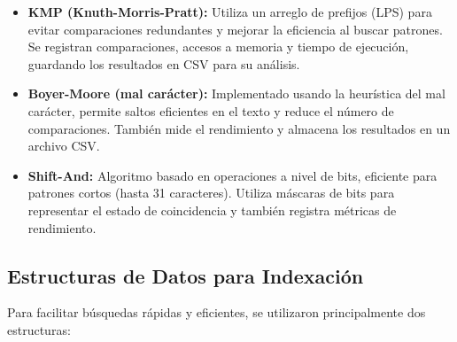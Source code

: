 \documentclass[9pt,letterpaper,onecolumn]{rho-class/rho}
\begin{document}
\begin{itemize}
    \item \textbf{KMP (Knuth-Morris-Pratt):}  
    Utiliza un arreglo de prefijos (LPS) para evitar comparaciones redundantes y mejorar la eficiencia al buscar patrones. Se registran comparaciones, accesos a memoria y tiempo de ejecución, guardando los resultados en CSV para su análisis.

    \item \textbf{Boyer-Moore (mal carácter):}  
    Implementado usando la heurística del mal carácter, permite saltos eficientes en el texto y reduce el número de comparaciones. También mide el rendimiento y almacena los resultados en un archivo CSV.

    \item \textbf{Shift-And:}  
    Algoritmo basado en operaciones a nivel de bits, eficiente para patrones cortos (hasta 31 caracteres). Utiliza máscaras de bits para representar el estado de coincidencia y también registra métricas de rendimiento.
\end{itemize}




\subsection{Estructuras de Datos para Indexación}

Para facilitar búsquedas rápidas y eficientes, se utilizaron principalmente dos estructuras:
\end{document}
